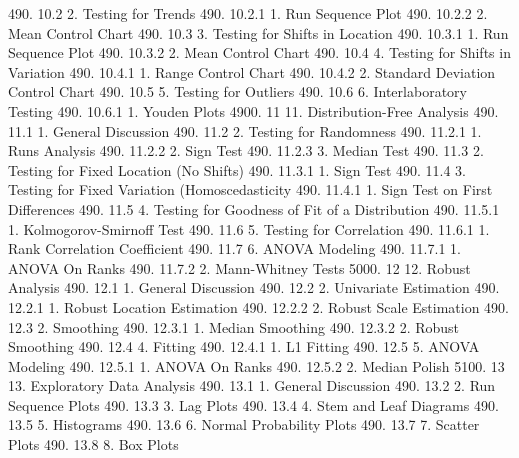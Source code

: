 490.      10.2                  2. Testing for Trends
490.      10.2.1                      1. Run Sequence Plot
490.      10.2.2                      2. Mean Control Chart
490.      10.3                  3. Testing for Shifts in Location
490.      10.3.1                      1. Run Sequence Plot
490.      10.3.2                      2. Mean Control Chart
490.      10.4                  4. Testing for Shifts in Variation
490.      10.4.1                      1. Range Control Chart
490.      10.4.2                      2. Standard Deviation Control Chart
490.      10.5                  5. Testing for Outliers
490.      10.6                  6. Interlaboratory Testing
490.      10.6.1                      1. Youden Plots
4900.     11             11. Distribution-Free Analysis
490.      11.1                  1. General Discussion
490.      11.2                  2. Testing for Randomness
490.      11.2.1                      1. Runs Analysis
490.      11.2.2                      2. Sign Test
490.      11.2.3                      3. Median Test
490.      11.3                  2. Testing for Fixed Location (No Shifts)
490.      11.3.1                      1. Sign Test
490.      11.4                  3. Testing for Fixed Variation (Homoscedasticity
490.      11.4.1                      1. Sign Test on First Differences
490.      11.5                  4. Testing for Goodness of Fit of a Distribution
490.      11.5.1                      1. Kolmogorov-Smirnoff Test
490.      11.6                  5. Testing for Correlation
490.      11.6.1                      1. Rank Correlation Coefficient
490.      11.7                  6. ANOVA Modeling
490.      11.7.1                      1. ANOVA On Ranks
490.      11.7.2                      2. Mann-Whitney Tests
5000.     12             12. Robust Analysis
490.      12.1                  1. General Discussion
490.      12.2                  2. Univariate Estimation
490.      12.2.1                      1. Robust Location Estimation
490.      12.2.2                      2. Robust Scale Estimation
490.      12.3                  2. Smoothing
490.      12.3.1                      1. Median Smoothing
490.      12.3.2                      2. Robust Smoothing
490.      12.4                  4. Fitting
490.      12.4.1                      1. L1 Fitting
490.      12.5                  5. ANOVA Modeling
490.      12.5.1                      1. ANOVA On Ranks
490.      12.5.2                      2. Median Polish
5100.     13             13. Exploratory Data Analysis
490.      13.1                  1. General Discussion
490.      13.2                  2. Run Sequence Plots
490.      13.3                  3. Lag Plots
490.      13.4                  4. Stem and Leaf Diagrams
490.      13.5                  5. Histograms
490.      13.6                  6. Normal Probability Plots
490.      13.7                  7. Scatter Plots
490.      13.8                  8. Box Plots
 
